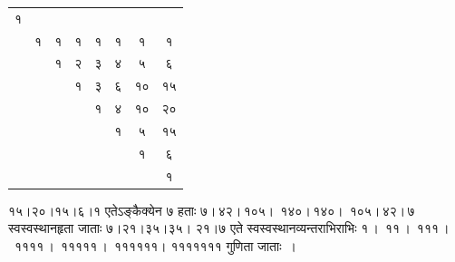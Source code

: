 \documentclass[11pt, openany]{book}
\begin{document}
\noindent\begin{minipage}[]{0.5\textwidth}
\vspace{2mm}

\begin{tabular}{|c|c|c|c|c|c|c|c|}
\cline{1-1}
{\hbox{१}} & \multicolumn{1}{c}{}  &  \multicolumn{1}{c}{} & \multicolumn{1}{c}{} &  \multicolumn{1}{c}{} & \multicolumn{1}{c}{} & \multicolumn{1}{c}{} & \multicolumn{1}{c}{}\\
\cline{1-8}
\multicolumn{1}{c|}{} & {\hbox{१}} & {\hbox{१}} & {\hbox{१}}& {\hbox{१}} & {\hbox{१}}& {\hbox{१}}& {\hbox{१}} \\
\cline{2-8} 
\multicolumn{1}{c}{} & \multicolumn{1}{c|}{}  & {\hbox{१}} &{\hbox{२}} & {\hbox{३}}& {\hbox{४}} & {\hbox{५}}& {\hbox{६}} \\
\cline{3-8} 
\multicolumn{1}{c}{} & \multicolumn{1}{c}{}  & \multicolumn{1}{c|}{}  &{\hbox{१}} & {\hbox{३}}& {\hbox{६}} & {\hbox{१०}}& {\hbox{१५}} \\
\cline{4-8}  
\multicolumn{1}{c}{} & \multicolumn{1}{c}{}  & \multicolumn{1}{c}{}  & \multicolumn{1}{c|}{} & 
{\hbox{१}} & {\hbox{४}}& {\hbox{१०}} & {\hbox{२०}} \\
\cline{5-8}  
\multicolumn{1}{c}{} & \multicolumn{1}{c}{}  & \multicolumn{1}{c}{}  & \multicolumn{1}{c}{} & \multicolumn{1}{c|}{}& {\hbox{१}}& {\hbox{५}} & {\hbox{१५}} \\
\cline{6-8} 
\multicolumn{1}{c}{} & \multicolumn{1}{c}{}  & \multicolumn{1}{c}{}  & \multicolumn{1}{c}{} & \multicolumn{1}{c}{}& \multicolumn{1}{c|}{} & {\hbox{१}} & {\hbox{६}} \\
\cline{7-8} 
\multicolumn{1}{c}{} & \multicolumn{1}{c}{}  & \multicolumn{1}{c}{}  & \multicolumn{1}{c}{} & \multicolumn{1}{c}{}& \multicolumn{1}{c}{} & \multicolumn{1}{c|}{} & {\hbox{१}} \\
\cline{8-8}                                                                                    \end{tabular}
\end{minipage} 
\hfill
\begin{minipage}{.48\textwidth} 
\vspace{-11mm}

१५।२०।१५।६।१ एतेऽङ्कैक्येन ७ हताः ७।\,४२।\,१०५।~१४०।\,१४०।~१०५।\,४२।\,७ स्वस्वस्थानहृता जाताः ७।२१।३५।३५। २१।७ एते स्वस्वस्थानव्यन्तराभिराभिः १\,।~११\,।~१११\,।~११११\,।~१११११\,।~११११११। १११११११ गुणिता जाताः~।
\end{minipage}  
\vspace{4mm}
\end{document}
